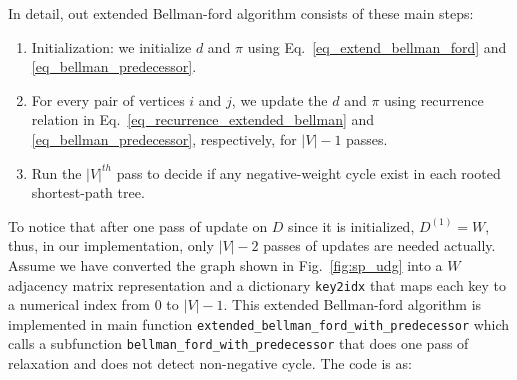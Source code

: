 \documentclass[../main.tex]{subfiles}
\begin{document}
In detail, out extended Bellman-ford algorithm consists of these main steps:
\begin{enumerate}
    \item Initialization: we initialize $d$ and $\pi$ using Eq.~\ref{eq_extend_bellman_ford} and \ref{eq_bellman_predecessor}. 
    \item For every pair of vertices $i$ and $j$, we update the $d$ and $\pi$ using recurrence relation in Eq.~\ref{eq_recurrence_extended_bellman} and \ref{eq_bellman_predecessor}, respectively, for $|V|-1$ passes.
    \item Run the ${|V|}^{th}$ pass to decide if any negative-weight cycle exist in each  rooted shortest-path tree.
\end{enumerate}
To notice that after one pass of update on $D$ since it is initialized, $D^{(1)} = W$, thus, in our implementation, only $|V|-2$ passes of updates are needed actually. Assume we have converted the graph shown in Fig.~\ref{fig:sp_udg} into a $W$ adjacency matrix representation and a dictionary \texttt{key2idx} that maps each key to a numerical index from $0$ to $|V|-1$. This extended Bellman-ford algorithm is implemented in main function \texttt{extended\_bellman\_ford\_with\_predecessor} which calls a subfunction \texttt{bellman\_ford\_with\_predecessor} that does one pass of relaxation and does not detect non-negative cycle.  The code is as:
\end{document}
